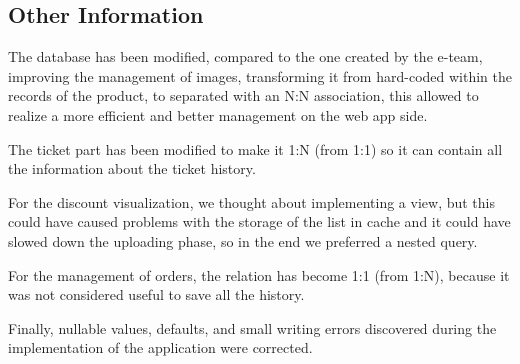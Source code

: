 \subsection{Other Information}


The database has been modified, compared to the one created by the e-team, improving the management of images, transforming
it from hard-coded within the records of the product, to separated with an N:N association, this allowed to realize
a more efficient and better management on the web app side.

The ticket part has been modified to make it 1:N (from 1:1) so it can contain all the information about the ticket history.

For the discount visualization, we thought about implementing a view, but this could have caused problems with the storage
of the list in cache and it could have slowed down the uploading phase, so in the end we preferred a nested query.

For the management of orders, the relation has become 1:1 (from 1:N), because it was
not considered useful to save all the history.

Finally, nullable values, defaults, and small writing errors discovered during the implementation of the application
were corrected.
